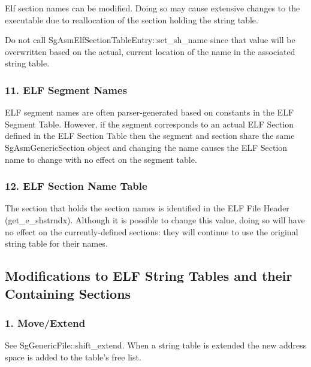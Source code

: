    Elf section names can be modified. Doing so may cause extensive changes to the executable due to reallocation of the section
   holding the string table.

   Do not call SgAsmElfSectionTableEntry::set\_sh\_name since that value will be overwritten based on the actual, current
   location of the name in the associated string table.

\subsubsection{11. ELF Segment Names}

   ELF segment names are often parser-generated based on constants in the ELF Segment Table. However, if the segment
   corresponds to an actual ELF Section defined in the ELF Section Table then the segment and section share the same
   SgAsmGenericSection object and changing the name causes the ELF Section name to change with no effect on the segment table.

\subsubsection{12. ELF Section Name Table}

   The section that holds the section names is identified in the ELF File Header (get\_e\_shstrndx). Although it is possible to
   change this value, doing so will have no effect on the currently-defined sections: they will continue to use the original
   string table for their names.

\subsection{Modifications to ELF String Tables and their Containing Sections}

\subsubsection{1. Move/Extend}

   See SgGenericFile::shift\_extend.  When a string table is extended the new address space is added to the table's free list.

